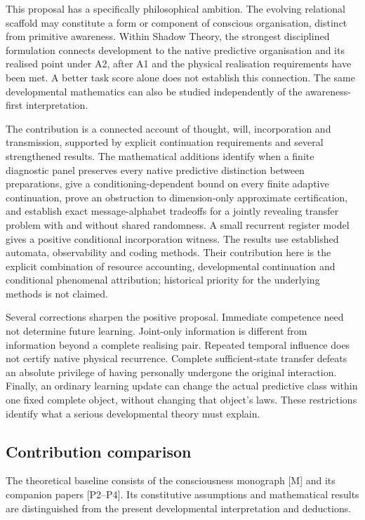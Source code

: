 \documentclass[
  11pt,
  a4paper,
]{article}
\begin{document}
This proposal has a specifically philosophical ambition. The evolving
relational scaffold may constitute a form or component of conscious
organisation, distinct from primitive awareness. Within Shadow Theory,
the strongest disciplined formulation connects development to the native
predictive organisation and its realised point under A2, after A1 and
the physical realisation requirements have been met. A better task score
alone does not establish this connection. The same developmental
mathematics can also be studied independently of the awareness-first
interpretation.

The contribution is a connected account of thought, will, incorporation
and transmission, supported by explicit continuation requirements and
several strengthened results. The mathematical additions identify when a
finite diagnostic panel preserves every native predictive distinction
between preparations, give a conditioning-dependent bound on every
finite adaptive continuation, prove an obstruction to dimension-only
approximate certification, and establish exact message-alphabet
tradeoffs for a jointly revealing transfer problem with and without
shared randomness. A small recurrent register model gives a positive
conditional incorporation witness. The results use established automata,
observability and coding methods. Their contribution here is the
explicit combination of resource accounting, developmental continuation
and conditional phenomenal attribution; historical priority for the
underlying methods is not claimed.

Several corrections sharpen the positive proposal. Immediate competence
need not determine future learning. Joint-only information is different
from information beyond a complete realising pair. Repeated temporal
influence does not certify native physical recurrence. Complete
sufficient-state transfer defeats an absolute privilege of having
personally undergone the original interaction. Finally, an ordinary
learning update can change the actual predictive class within one fixed
complete object, without changing that object's laws. These restrictions
identify what a serious developmental theory must explain.

\subsection{Contribution comparison}\label{contribution-comparison}

The theoretical baseline consists of the consciousness monograph {[}M{]} and its companion papers {[}P2--P4{]}. Its constitutive assumptions and mathematical results are distinguished from the present developmental interpretation and deductions.
\end{document}
